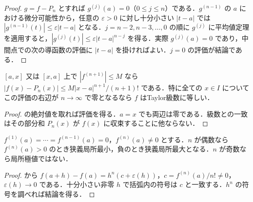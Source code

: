 \begin{proof}
$g=f-P_n$ とすれば $g^{(j)}(a)=0$（$0\leq j\leq n$）である．$g^{(n-1)}$ の $a$ における微分可能性から，任意の $\varepsilon>0$ に対し十分小さい $|t-a|$ では $|g^{(n-1)}(t)|\leq\varepsilon|t-a|$ となる．$j=n-2,n-3,\ldots,0$ の順に $g^{(j)}$ に平均値定理を適用すると，$|g^{(j)}(t)|\leq\varepsilon|t-a|^{n-j}$ を得る．実際 $g^{(j)}(a)=0$ であり，中間点での次の導函数の評価に $|t-a|$ を掛ければよい．$j=0$ の評価が結論である．
\end{proof}
\begin{prop}[Taylor剰余の一様評価]
$[a,x]$ 又は $[x,a]$ 上で $|f^{(n+1)}|\leq M$ なら $|f(x)-P_n(x)|\leq M|x-a|^{n+1}/(n+1)!$ である．特に全ての $x\in I$ についてこの評価の右辺が $n\to\infty$ で零となるなら $f$ はTaylor級数に等しい．
\end{prop}
\begin{proof}
 の絶対値を取れば評価を得る．$a=x$ でも両辺は零である．級数との一致はその部分和 $P_n(x)$ が $f(x)$ に収束することに他ならない．
\end{proof}
\begin{prop}[高階微分による局所極値の判定]
$f^{(1)}(a)=\cdots=f^{(n-1)}(a)=0$，$f^{(n)}(a)\ne0$ とする．$n$ が偶数なら $f^{(n)}(a)>0$ のとき狭義局所最小，負のとき狭義局所最大となる．$n$ が奇数なら局所極値ではない．
\end{prop}
\begin{proof}
 から $f(a+h)-f(a)=h^n(c+\varepsilon(h))$，$c=f^{(n)}(a)/n!\ne0$，$\varepsilon(h)\to0$ である．十分小さい非零 $h$ で括弧内の符号は $c$ と一致する．$h^n$ の符号を調べれば結論を得る．
\end{proof}
